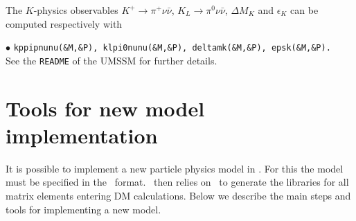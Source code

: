 \documentclass[12pt,a4paper]{article}
\begin{document}
The $K$-physics observables $K^+ \to \pi^+\nu\bar{\nu}$, $K_L \to \pi^0 \nu\bar{\nu}$, $\Delta M_K$ and $\epsilon_K$ can be computed respectively with

\noindent
$\bullet$ {\tt kppipnunu(\&M,\&P), klpi0nunu(\&M,\&P), deltamk(\&M,\&P), epsk(\&M,\&P).}\\ 

\noindent
See the \verb|README| of the UMSSM for further details.


\section{Tools for new model implementation}
\label{sec:newmodel}

It is possible to  implement a new particle physics  model  in \micro.
For this the model must be specified in the
\calchep\ format. \micro\ then relies on \calchep\ 
to generate the libraries for all matrix elements entering DM calculations. 
Below we describe the main steps and tools for implementing a new model.
\end{document}
